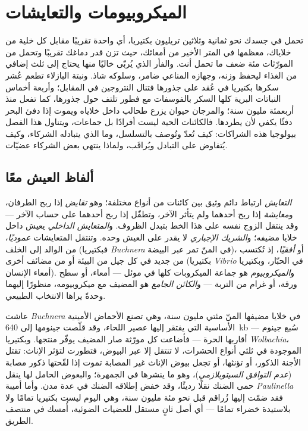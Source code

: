 \chapter{الميكروبيومات والتعايشات}\label{ch:b3:microbiomes}

تحمل في جسدك نحو ثمانية وثلاثين تريليون بكتيريا، أي واحدة
تقريبًا مقابل كل خلية من خلاياك، معظمها في المتر الأخير من
أمعائك، حيث تزن قدر دماغك تقريبًا وتحمل من المورّثات مئة
ضعف ما تحمل أنت. والفأر الذي يُربّى خاليًا منها يحتاج إلى
ثلث إضافي من الغذاء ليحفظ وزنه، وجهازه المناعي ضامر،
وسلوكه شاذ. ونبتة البازلاء تطعم عُشر سكرها بكتيريا في عُقد
على جذورها فتنال النتروجين في المقابل؛ وأربعة أخماس
النباتات البرية كلها  السكر بالفوسفات مع فطور تلتف
حول جذورها، كما تفعل منذ أربعمئة مليون سنة؛ والمرجان حيوان
يزرع طحالب داخل خلاياه ويموت إذا دفئ البحر دفئًا يكفي لأن
يطردها. فالكائنات الحية ليست أفرادًا بل جماعات، ويتناول
هذا الفصل بيولوجيا هذه الشراكات: كيف تُعدّ وتُوصف
بالتسلسل، وما الذي يتبادله الشركاء، وكيف يُتفاوض على
التبادل ويُراقَب، ولماذا ينتهي بعض الشركاء عضيّات.

\section{ألفاظ العيش معًا}

\begin{definition}[التعايش]\label{def:b3:microbiomes:symbiosis}
\emph{التعايش} ارتباط دائم وثيق بين كائنات من أنواع
مختلفة؛ وهو \emph{تقايض} إذا ربح الطرفان، و\emph{معايشة}
إذا ربح أحدهما ولم يتأثر الآخر، وتطفّل إذا ربح أحدهما على
حساب الآخر --- وقد ينتقل الزوج نفسه على هذا الخط بتبدل
الظروف. و\emph{المتعايش الداخلي} يعيش داخل خلايا مضيفه؛
و\emph{الشريك الإجباري} لا يقدر على العيش وحده. وتنتقل
المتعايشات \emph{عموديًا}، من الوالد إلى الخلف (فبكتيريا
\emph{Buchnera} في المنّ تمر عبر البيضة)، أو \emph{أفقيًا}،
إذ تُكتسب من جديد في كل جيل من البيئة أو من مضائف أخرى
(بكتيريا \emph{Vibrio} في الحبّار، وبكتيريا أمعاء الإنسان).
و\emph{الميكروبيوم} هو جماعة الميكروبات كلها في موئل ---
أمعاء، أو سطح ورقة، أو غرام من التربة --- و\emph{الكائن
الجامع} هو المضيف مع ميكروبيومه، منظورًا إليهما وحدةً
يراها الانتخاب الطبيعي.
\end{definition}

\begin{example}\label{ex:b3:microbiomes:obligate}
عاشت \emph{Buchnera} في خلايا مضيفها المنّ مئتي مليون سنة،
وهي تصنع الأحماض الأمينية الأساسية التي يفتقر إليها عصير
اللحاء، وقد قلّصت جينومها إلى \qty{640}{kb} --- سُبع جينوم
أقاربها الحرة --- فأضاعت كل مورّثة صار المضيف يوفّر
منتجها. وبكتيريا \emph{Wolbachia}، الموجودة في ثلثي أنواع
الحشرات، لا تنتقل إلا عبر البيوض، فتطورت لتؤثر الإناث:
تقتل الأجنة الذكور، أو تؤنثها، أو تجعل بيوض الإناث غير
المصابة تموت إذا لقّحتها ذكور مصابة (\emph{عدم التوافق
السيتوبلازمي})، وهو ما ينشرها في الجمهرة؛ والبعوض الحامل
لها ينقل حمى الضنك نقلًا رديئًا، وقد خفض إطلاقه الضنك في
عدة مدن. وأما أميبة \emph{Paulinella} فقد ضمّت إليها
زُراقم قبل نحو مئة مليون سنة، وهي اليوم ليست بكتيريا تمامًا
ولا بلاستيدة خضراء تمامًا --- أي أصل ثانٍ مستقل للعضيات
الضوئية، أُمسك في منتصف الطريق.
\end{example}

